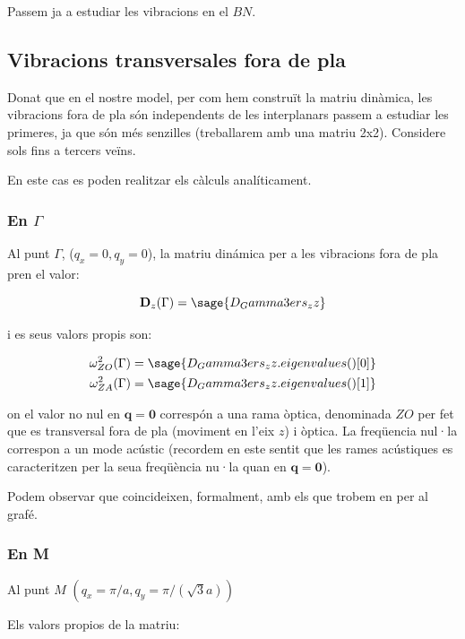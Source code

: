 \documentclass[12pt]{article} %
\let\vec\mathbf %
\begin{document}
{\newpage
Passem ja a estudiar les vibracions en el $BN$.
\subsection{Vibracions transversales fora de pla}
Donat que en el nostre model, per com hem construït la matriu dinàmica, les vibracions fora de pla són independents de les interplanars passem a estudiar les primeres, ja que són més senzilles (treballarem amb una matriu 2x2). Considere sols fins a tercers veïns.

En este cas es poden realitzar els càlculs analíticament.

\subsubsection{En $\Gamma$}
Al punt $\Gamma$, ($q_x=0, q_y=0$), la matriu dinámica  per a les vibracions fora de pla pren el valor:

\begin{equation}
\vec D_z(\Gamma)=\sage{D_Gamma3ers_zz}
\end{equation}

i es seus valors propis son:

\begin{equation}\begin{split}
\omega_{ZO}^2(\Gamma)&=\sage{D_Gamma3ers_zz.eigenvalues()[0]}\\
\omega_{ZA}^2(\Gamma)&=\sage{D_Gamma3ers_zz.eigenvalues()[1]} 
\end{split}
\end{equation}



on el valor no nul en $\vec q=\vec 0$ correspón a una rama òptica, denominada $ZO$ per fet que es transversal fora de pla (moviment en l'eix $z$) i òptica. La freqüencia nul·la correspon a un mode acústic (recordem en este sentit que les rames acústiques es caracteritzen per la seua freqüència nu·la quan en $\vec q=\vec 0$). 

Podem observar que coincideixen, formalment, amb els que trobem en \cite{falkovsky08_symmet_const_phonon_disper_graph} per al grafé.

\subsubsection{En M}

Al punt $M$ $\left(q_x=\pi/a,q_y=\pi/(\sqrt 3 a)\right)$

Els valors propios de la matriu:

}
\end{document}
